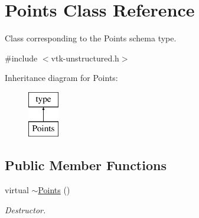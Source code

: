 \hypertarget{classPoints}{}\section{Points Class Reference}
\label{classPoints}


Class corresponding to the Points schema type.  




{\ttfamily \#include $<$vtk-\/unstructured.\+h$>$}

Inheritance diagram for Points\+:\begin{figure}[H]
\begin{center}
\leavevmode
\includegraphics[height=2.000000cm]{classPoints}
\end{center}
\end{figure}
\subsection*{Public Member Functions}
\begin{DoxyCompactItemize}
\item 
virtual \hyperlink{classPoints_a9d56d7dc8b6a6f492e07d354eb379c12}{$\sim$\+Points} ()
\begin{DoxyCompactList}\small\item\em Destructor. \end{DoxyCompactList}\end{DoxyCompactItemize}
